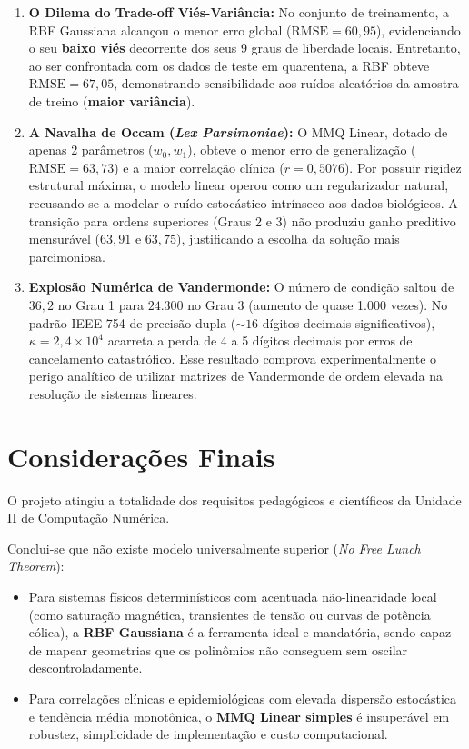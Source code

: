 \documentclass[12pt,a4paper]{article}
\begin{document}
\begin{enumerate}
    \item \textbf{O Dilema do Trade-off Viés-Variância:} No conjunto de treinamento, a RBF Gaussiana alcançou o menor erro global ($\text{RMSE} = 60{,}95$), evidenciando o seu \textbf{baixo viés} decorrente dos seus 9 graus de liberdade locais. Entretanto, ao ser confrontada com os dados de teste em quarentena, a RBF obteve $\text{RMSE} = 67{,}05$, demonstrando sensibilidade aos ruídos aleatórios da amostra de treino (\textbf{maior variância}).
    \item \textbf{A Navalha de Occam (\textit{Lex Parsimoniae}):} O MMQ Linear, dotado de apenas 2 parâmetros ($w_0, w_1$), obteve o menor erro de generalização ($\text{RMSE} = 63{,}73$) e a maior correlação clínica ($r = 0{,}5076$). Por possuir rigidez estrutural máxima, o modelo linear operou como um regularizador natural, recusando-se a modelar o ruído estocástico intrínseco aos dados biológicos. A transição para ordens superiores (Graus 2 e 3) não produziu ganho preditivo mensurável ($63{,}91$ e $63{,}75$), justificando a escolha da solução mais parcimoniosa.
    \item \textbf{Explosão Numérica de Vandermonde:} O número de condição saltou de $36{,}2$ no Grau 1 para $24.300$ no Grau 3 (aumento de quase 1.000 vezes). No padrão IEEE 754 de precisão dupla ($\sim 16$ dígitos decimais significativos), $\kappa = 2{,}4 \times 10^4$ acarreta a perda de 4 a 5 dígitos decimais por erros de cancelamento catastrófico. Esse resultado comprova experimentalmente o perigo analítico de utilizar matrizes de Vandermonde de ordem elevada na resolução de sistemas lineares.
\end{enumerate}

\section{Considerações Finais}
O projeto atingiu a totalidade dos requisitos pedagógicos e científicos da Unidade II de Computação Numérica. 

Conclui-se que não existe modelo universalmente superior (\textit{No Free Lunch Theorem}):
\begin{itemize}
    \item Para sistemas físicos determinísticos com acentuada não-linearidade local (como saturação magnética, transientes de tensão ou curvas de potência eólica), a \textbf{RBF Gaussiana} é a ferramenta ideal e mandatória, sendo capaz de mapear geometrias que os polinômios não conseguem sem oscilar descontroladamente.
    \item Para correlações clínicas e epidemiológicas com elevada dispersão estocástica e tendência média monotônica, o \textbf{MMQ Linear simples} é insuperável em robustez, simplicidade de implementação e custo computacional.
\end{itemize}
\end{document}
